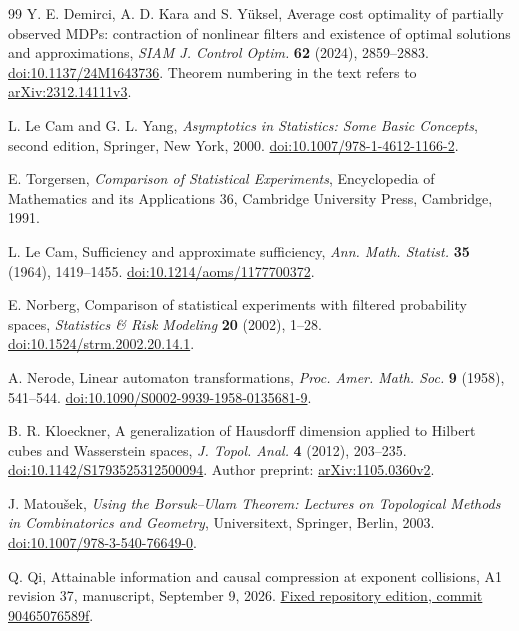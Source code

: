 \begin{thebibliography}{99}
Y. E. Demirci, A. D. Kara and S. Y\"uksel, Average cost optimality of
partially observed MDPs: contraction of nonlinear filters and existence
of optimal solutions and approximations,
\emph{SIAM J. Control Optim.} \textbf{62} (2024), 2859--2883.
\href{https://doi.org/10.1137/24M1643736}{doi:10.1137/24M1643736}.
Theorem numbering in the text refers to
\href{https://arxiv.org/abs/2312.14111v3}{arXiv:2312.14111v3}.

L. Le Cam and G. L. Yang, \emph{Asymptotics in Statistics: Some Basic
Concepts}, second edition, Springer, New York, 2000.
\href{https://doi.org/10.1007/978-1-4612-1166-2}{doi:10.1007/978-1-4612-1166-2}.

E. Torgersen, \emph{Comparison of Statistical Experiments},
Encyclopedia of Mathematics and its Applications 36,
Cambridge University Press, Cambridge, 1991.

L. Le Cam, Sufficiency and approximate sufficiency,
\emph{Ann. Math. Statist.} \textbf{35} (1964), 1419--1455.
\href{https://doi.org/10.1214/aoms/1177700372}{doi:10.1214/aoms/1177700372}.

E. Norberg, Comparison of statistical experiments with filtered
probability spaces, \emph{Statistics \& Risk Modeling} \textbf{20}
(2002), 1--28.
\href{https://doi.org/10.1524/strm.2002.20.14.1}{doi:10.1524/strm.2002.20.14.1}.

A. Nerode, Linear automaton transformations,
\emph{Proc. Amer. Math. Soc.} \textbf{9} (1958), 541--544.
\href{https://doi.org/10.1090/S0002-9939-1958-0135681-9}{doi:10.1090/S0002-9939-1958-0135681-9}.

B. R. Kloeckner, A generalization of Hausdorff dimension applied to
Hilbert cubes and Wasserstein spaces,
\emph{J. Topol. Anal.} \textbf{4} (2012), 203--235.
\href{https://doi.org/10.1142/S1793525312500094}{doi:10.1142/S1793525312500094}.
Author preprint: \href{https://arxiv.org/abs/1105.0360v2}{arXiv:1105.0360v2}.

J. Matou\v{s}ek, \emph{Using the Borsuk--Ulam Theorem: Lectures on
Topological Methods in Combinatorics and Geometry}, Universitext,
Springer, Berlin, 2003.
\href{https://doi.org/10.1007/978-3-540-76649-0}{doi:10.1007/978-3-540-76649-0}.

Q. Qi, Attainable information and causal compression at exponent
collisions, A1 revision 37, manuscript, September 9, 2026.
\href{https://github.com/TrillionniumFoundation/theta-theory/tree/90465076589f5e5c69227d624f278c47744f1c1d}{Fixed repository edition, commit 90465076589f}.



\end{thebibliography}
